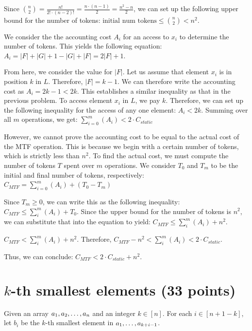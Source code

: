 \documentclass[11pt]{article}
\begin{document}
\begin{enumerate}
Since $\binom{n}{2} =\frac{n!}{2! \cdot (n-2)!} = \frac{n \cdot (n-1)}{2} = \frac{n^2 - n}{2}$, 
we can set up the following upper bound for the number of tokens: $\text{initial num tokens} \leq \binom{n}{2} < n^2$. 

We consider the the accounting cost $A_i$ for an access to $x_i$ to determine the number of tokens. 
This yields the following equation: $A_i = |F| + |G| + 1 - |G| + |F| = 2|F| + 1$. 

From here, we consider the value for $|F|$. Let us assume that element $x_i$ is in position $k$ in $L$. Therefore, $|F| = k - 1$. 
We can therefore write the accounting cost as $A_i = 2k - 1 < 2k$. 
This establishes a similar inequality as that in the previous problem. To access element $x_i$ in $L$, we pay $k$. 
Therefore, we can set up the following inequality for the access of any one element: $A_{i} < 2k$. 
Summing over all $m$ operations, we get: $\sum_{i=0}^{m}(A_i) < 2 \cdot C_{static}$

However, we cannot prove the accounting cost to be equal to the actual cost of the MTF operation. 
This is because we begin with a certain number of tokens, which is strictly less than $n^2$. 
To find the actual cost, we must compute the number of tokens $T$ spent over $m$ operations.
We consider $T_0$ and $T_m$ to be the initial and final number of tokens, respectively: $C_{MTF} = \sum_{i=0}^{m}(A_i) + (T_0 - T_m)$

Since $T_m \geq 0$, we can write this as the following inequality: $C_{MTF} \leq \sum_{i}^{m}(A_i) + T_0$. 
Since the upper bound for the number of tokens is $n^2$, we can substitute that into the equation to yield: $C_{MTF} \leq \sum_{i}^{m}(A_i) + n^2$.

$C_{MTF} < \sum_{i}^{m}(A_i) + n^2$. Therefore, $C_{MTF} - n^2 < \sum_{i}^{m}(A_i) < 2 \cdot C_{static}$. 

Thus, we can conclude: $C_{MTF} < 2 \cdot C_{static} + n^2$.

\end{enumerate}


\section{\texorpdfstring{$k$-th smallest elements (33 points)}{k-th smallest elements (33 points)}}
Given an array $a_1,a_2,\mathellipsis,a_n$ and an integer $k\in[n]$. For each $i\in[n+1-k]$, 
let $b_i$ be the $k$-th smallest element in $a_1,\mathellipsis,a_{k+i-1}$.
\end{document}
